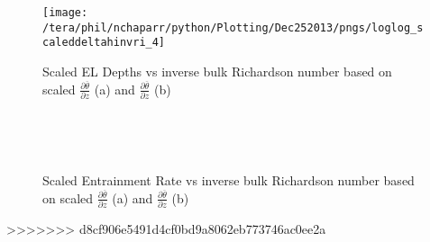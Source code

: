 \begin{figure}[htbp]
                \texttt{[image: /tera/phil/nchaparr/python/Plotting/Dec252013/pngs/loglog\_scaleddeltahinvri\_4]}\\
       
        \caption{Scaled EL Depths vs inverse bulk Richardson number based on scaled $\frac{\partial \overline{\theta}}{\partial z}$ (a) and $\frac{\partial \overline{\theta}}{\partial z}$ (b)}
        \label{fig:ELvsri}
\end{figure}

\begin{figure}[htbp]
\begin{minipage}[b]{0.5\linewidth}
        \\
        \end{minipage}             
\quad
\begin{minipage}[b]{0.5\linewidth}
        \\
       
       \end{minipage}
        \caption{Scaled Entrainment Rate vs inverse bulk Richardson number based on scaled $\frac{\partial \overline{\theta}}{\partial z}$ (a) and $\frac{\partial \overline{\theta}}{\partial z}$ (b)}
        \label{fig:scaledweinvri2}
\end{figure}
>>>>>>> d8cf906e5491d4cf0bd9a8062eb773746ac0ee2a

\endinput

Any text after an \endinput is ignored.
You could put scraps here or things in progress.
